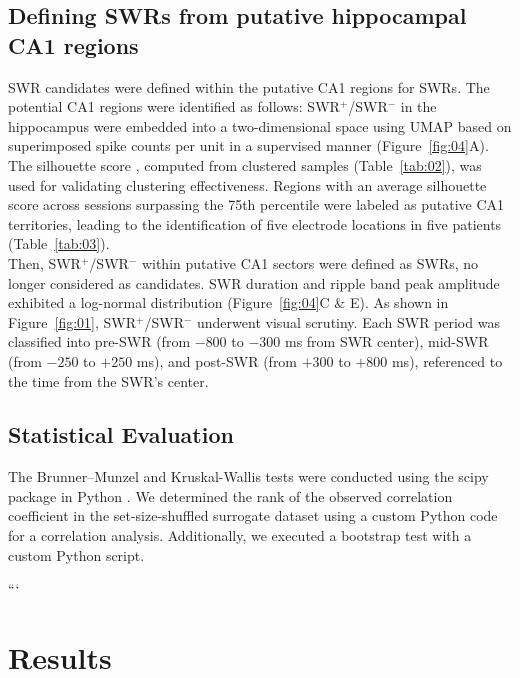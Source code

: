 \documentclass[final,3p,times,twocolumn]{elsarticle}
\begin{document}
\subsection{Defining SWRs from putative hippocampal CA1 regions}
SWR candidates were defined within the putative CA1 regions for SWRs. The potential CA1 regions were identified as follows: SWR$^+$/SWR$^-$ in the hippocampus were embedded into a two-dimensional space using UMAP based on superimposed spike counts per unit in a supervised manner \cite{mcinnes_umap_2018}(Figure~\ref{fig:04}A). The silhouette score \cite{rousseeuw_silhouettes_1987}, computed from clustered samples (Table~\ref{tab:02}), was used for validating clustering effectiveness. Regions with an average silhouette score across sessions surpassing the 75th percentile were labeled as putative CA1 territories, leading to the identification of five electrode locations in five patients (Table~\ref{tab:03}).
\\
\indent
Then, SWR$^+$/SWR$^-$ within putative CA1 sectors were defined as SWRs, no longer considered as candidates. SWR duration and ripple band peak amplitude exhibited a log-normal distribution (Figure~\ref{fig:04}C \& E). As shown in Figure~\ref{fig:01}, SWR$^+$/SWR$^-$ underwent visual scrutiny. Each SWR period was classified into pre-SWR (from $-800$ to $-300$ ms from SWR center), mid-SWR (from $-250$ to $+250$ ms), and post-SWR (from $+300$ to $+800$ ms), referenced to the time from the SWR's center.

\subsection{Statistical Evaluation}
The Brunner--Munzel and Kruskal-Wallis tests were conducted using the scipy package in Python \cite{virtanen_scipy_2020}. We determined the rank of the observed correlation coefficient in the set-size-shuffled surrogate dataset using a custom Python code for a correlation analysis. Additionally, we executed a bootstrap test with a custom Python script.

\label{sec:methods}
```

\section{Results}
\end{document}
